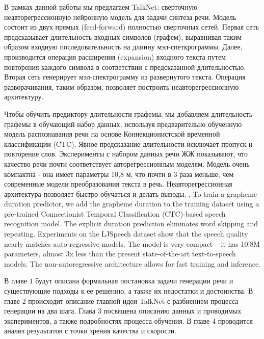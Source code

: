 В рамках данной работы мы предлагаем TalkNet: сверточную неавторегрессионную нейронную модель для задачи синтеза речи. Модель состоит из двух прямых (feed-forward) полностью сверточных сетей. Первая сеть предсказывает длительность входных символов (графем), выравнивая таким образом входную последовательность на длинну мэл-спеткрограммы. Далее, производится операция расширения (expansion) входного текста путем повторения каждого символа в соответствии с предсказанной длительностью. Вторая сеть генерирует мэл-спектрограмму из развернутого текста. Операция разворачивания, таким образом, позволяет построить неавторегрессионную архитектуру.

Чтобы обучить предиктору длительности графемы, мы добавляем длительность графемы в обучающий набор данных, используя предварительно обученную модель распознавания речи на основе Коннекционистской временной классификации (CTC). Явное предсказание длительности исключает пропуск и повторение слов. Эксперименты с набором данных речи ЖЖ показывают, что качество речи почти соответствует авторегрессионным моделям. Модель очень компактна - она имеет параметры 10,8 м, что почти в 3 раза меньше, чем современные модели преобразования текста в речь. Неавторегрессионная архитектура позволяет быстро обучаться и делать выводы.
\sep
To train a grapheme duration predictor, we add the grapheme duration to the training dataset using a pre-trained Connectionist Temporal Classification (CTC)-based speech recognition model. The explicit duration prediction eliminates word skipping and repeating. Experiments on the LJSpeech dataset show that the speech quality nearly matches auto-regressive models. The model is very compact -- it has 10.8M parameters, almost 3x less than the present state-of-the-art text-to-speech models. The non-autoregressive architecture allows for fast training and inference.

В главе $1$ будут описана формальная постановка задачи генерации речи и существующие подходы к ее решению, а также их недостатки и достоинства. В главе $2$ происходит описание главной идеи TalkNet с разбиением процесса генерации на два шага. Глава $3$ посвящена описанию данных и проводимых экспериментов, а также подробностях процесса обучения. В главе $4$ проводится анализ результатов с точки зрения качества и скорости.